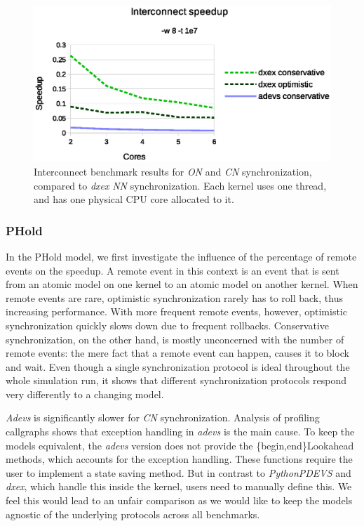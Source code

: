 \begin{figure}
	\center
	\includegraphics[width=\columnwidth]{fig/interconnect_parallel.eps}
	\caption{Interconnect benchmark results for \textit{ON} and \textit{CN} synchronization, compared to \textit{dxex} \textit{NN} synchronization.
             Each kernel uses one thread, and has one physical CPU core allocated to it.}
	\label{fig:interconnect_benchmark_parallel}
\end{figure}

\subsubsection{PHold}
In the PHold model, we first investigate the influence of the percentage of remote events on the speedup.
A remote event in this context is an event that is sent from an atomic model on one kernel to an atomic model on another kernel.
When remote events are rare, optimistic synchronization rarely has to roll back, thus increasing performance.
With more frequent remote events, however, optimistic synchronization quickly slows down due to frequent rollbacks.
Conservative synchronization, on the other hand, is mostly unconcerned with the number of remote events: the mere fact that a remote event can happen, causes it to block and wait.
Even though a single synchronization protocol is ideal throughout the whole simulation run, it shows that different synchronization protocols respond very differently to a changing model.

\textit{Adevs} is significantly slower for \textit{CN} synchronization.
Analysis of profiling callgraphs shows that exception handling in \textit{adevs} is the main cause. 
To keep the models equivalent, the \textit{adevs} version does not provide the \{begin,end\}Lookahead methods, which accounts for the exception handling.
These functions require the user to implement a state saving method.
But in contrast to \textit{PythonPDEVS} and \textit{dxex}, which handle this inside the kernel, users need to manually define this.
We feel this would lead to an unfair comparison as we would like to keep the models agnostic of the underlying protocols across all benchmarks.

